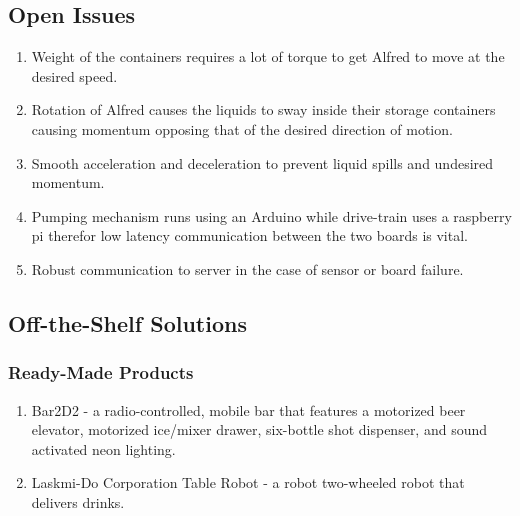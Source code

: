 \documentclass [11pt]{article}
\begin{document}
\subsection{Open Issues}
	\begin{enumerate}[label=\textbf{(\roman*)}]
		\item Weight of the containers requires a lot of torque to get Alfred to move at the desired speed.
		\item Rotation of Alfred causes the liquids to sway inside their storage containers causing momentum opposing that of the desired direction of motion.
		\item Smooth acceleration and deceleration to prevent liquid spills and undesired momentum.
		\item Pumping mechanism runs using an Arduino while drive-train uses a raspberry pi therefor low latency communication between the two boards is vital.
		\item Robust communication to server in the case of sensor or board failure.	
	\end{enumerate}

\subsection{Off-the-Shelf Solutions}

\subsubsection{Ready-Made Products}
	\begin{enumerate}[label=\textbf{(\roman*)}]
		\item Bar2D2 - a radio-controlled, mobile bar that features a motorized beer elevator, motorized ice/mixer drawer, six-bottle shot dispenser, and sound activated neon lighting. 
		\item Laskmi-Do Corporation Table Robot - a robot two-wheeled robot that delivers drinks.
	\end{enumerate}
	
\end{document}
